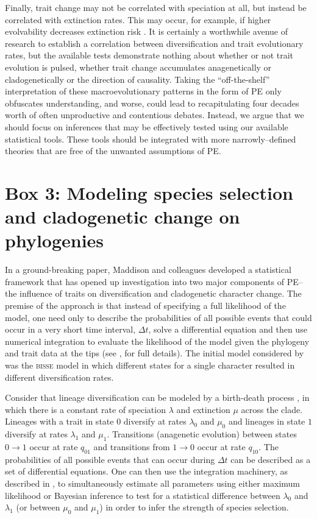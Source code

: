 Finally, trait change may not be correlated with speciation at all, but instead be correlated with extinction rates.  This may occur, for example, if higher evolvability decreases extinction risk \citep{Lanfear2010}. It is certainly a worthwhile avenue of research to establish a correlation between diversification and trait evolutionary rates, but the available tests demonstrate nothing about whether or not trait evolution is pulsed, whether trait change accumulates anagenetically or cladogenetically or the direction of causality. Taking the ``off-the-shelf'' interpretation of these macroevolutionary patterns in the form of PE only obfuscates understanding, and worse, could lead to recapitulating four decades worth of often unproductive and contentious debates. Instead, we argue that we should focus on inferences that may be effectively tested using our available statistical tools. These tools should be integrated with more narrowly--defined theories that are free of the unwanted assumptions of PE.  

\section{Box 3: Modeling species selection and cladogenetic change on phylogenies}

In a ground-breaking paper, Maddison and colleagues \citep{Maddison2007} developed a statistical framework that has opened up investigation into two major components of PE--the influence of traits on diversification \citep[``species selection'', \textit{sensu}][]{CoyneOrr, RaboskyMcCune2010} and cladogenetic character change. The premise of the approach is that instead of specifying a full likelihood of the model, one need only to describe the probabilities of all possible events that could occur in a very short time interval, $\Delta t$, solve a differential equation and then use numerical integration to evaluate the likelihood of the model given the phylogeny and trait data at the tips (see \citealt{Maddison2007}, for full details). The initial model considered by \citet{Maddison2007} was the \textsc{bisse} model in which different states for a single character resulted in different diversification rates.

Consider that lineage diversification can be modeled by a birth-death process \citep{Kendall1948}, in which there is a constant rate of speciation $\lambda$ and extinction $\mu$ across the clade. Lineages with a trait in state $0$ diversify at rates $\lambda_0$ and $\mu_0$ and lineages in state $1$ diversify at rates $\lambda_1$ and $\mu_1$. Transitions (anagenetic evolution) between states $0 \rightarrow 1$ occur at rate $q_{01}$ and transitions from $1 \rightarrow 0$ occur at rate $q_{10}$. The probabilities of all possible events that can occur during $\Delta t$ can be described as a set of differential equations. One can then use the integration machinery, as described in \citet{Maddison2007}, to simultaneously estimate all parameters using either maximum likelihood or Bayesian inference to test for a statistical difference between $\lambda_{0}$ and $\lambda_{1}$ (or between $\mu_0$ and $\mu_1$) in order to infer the strength of species selection.

